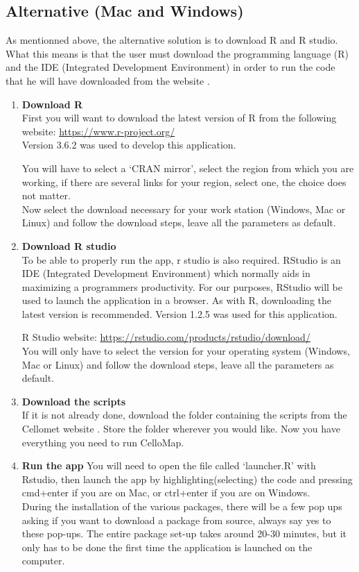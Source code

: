 \documentclass[11pt]{article}
\begin{document}
\subsection{Alternative (Mac and Windows)\label{alter_install}}
As mentionned above, the alternative solution is to download R and R studio. What this means is that the user must download the programming language (R) and the \acrshort{IDE} (Integrated Development Environment) in order to run the code that he will have downloaded from the website \cite{Cellomet}.
\begin{enumerate}
\item \textbf{Download R}\\
First you will want to download the latest version of R from the following website: \url{https://www.r-project.org/}
\\Version 3.6.2 was used to develop this application.

You will have to select a `CRAN mirror', select the region from which you are working, if there are several links for your region, select one, the choice does not matter.\\
Now select the download necessary for your work station (Windows, Mac or Linux) and follow the download steps, leave all the parameters as default.
\item \textbf{Download R studio}\\
To be able to properly run the app, r studio is also required. RStudio is an IDE (Integrated Development Environment) which normally aids in maximizing a programmers productivity. For our purposes, RStudio will be used to launch the application in a browser. As with R, downloading the latest version is recommended. Version 1.2.5 was used for this application.

R Studio website: \url{https://rstudio.com/products/rstudio/download/}
\\

You will only have to select the version for your operating system (Windows, Mac or Linux) and follow the download steps, leave all the parameters as default.
\item \textbf{Download the scripts}\\
If it is not already done, download the folder containing the scripts from the Cellomet website \cite{Cellomet}.
Store the folder wherever you would like. Now you have everything you need to run CelloMap.

\item \textbf{Run the app}
You will need to open the file called `launcher.R' with Rstudio, then launch the app by highlighting(selecting) the code and pressing cmd+enter if you are on Mac, or ctrl+enter if you are on Windows.\\
During the installation of the various packages, there will be a few pop ups asking if you want to download a package from source, always say yes to these pop-ups. The entire package set-up takes around 20-30 minutes, but it only has to be done the first time the application is launched on the computer.

\end{enumerate}
\end{document}
